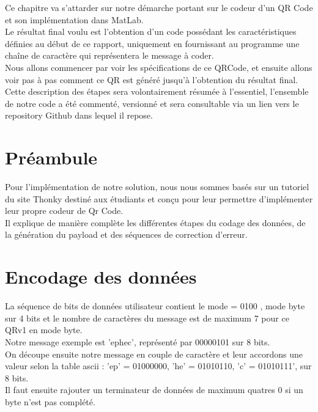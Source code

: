 \documentclass{report}
\begin{document}
	Ce chapitre va s'attarder sur notre démarche portant sur le codeur d'un QR Code et son implémentation dans MatLab.\\
	Le résultat final voulu est l'obtention d'un code possédant les caractéristiques définies au début de ce rapport, uniquement en fournissant au programme une chaîne de caractère qui représentera le message à coder.\\

	Nous allons commencer par voir les spécifications de ce QRCode, et ensuite allons voir pas à pas comment ce QR est généré jusqu'à l'obtention du résultat final.\\

	Cette description des étapes sera volontairement résumée à l'essentiel, l'ensemble de notre code a été commenté, versionné et sera consultable via un lien vers le repository Github dans lequel il repose.\\

	\section{Préambule}

		Pour l'implémentation de notre solution, nous nous sommes basés sur un tutoriel du site Thonky destiné aux étudiants et conçu pour leur permettre d'implémenter leur propre codeur de Qr Code.\\
		Il explique de manière complète les différentes étapes du codage des données, de la génération du payload et des séquences de correction d'erreur.\\

	\section{Encodage des données}

		La séquence de bits de données utilisateur contient le mode = 0100 , mode byte sur 4 bits et le nombre de caractères du message est de maximum 7 pour ce QRv1 en mode byte.\\
		Notre message exemple est 'ephec', représenté par 00000101 sur 8 bits.\\

		On découpe ensuite notre message en couple de caractère et leur accordons une valeur selon la table ascii : 'ep' = 01000000, 'he' = 01010110, 'c' = 01010111', sur 8 bits.\\

		Il faut ensuite rajouter un terminateur de données de maximum quatres 0 si un byte n'est pas complété.\\
\end{document}

